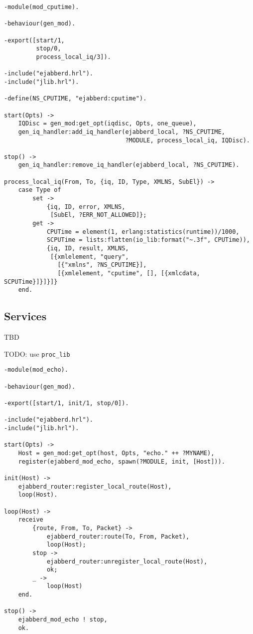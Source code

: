\documentclass[10pt]{article}
\begin{document}
\begin{verbatim}
-module(mod_cputime).

-behaviour(gen_mod).

-export([start/1,
         stop/0,
         process_local_iq/3]).

-include("ejabberd.hrl").
-include("jlib.hrl").

-define(NS_CPUTIME, "ejabberd:cputime").

start(Opts) ->
    IQDisc = gen_mod:get_opt(iqdisc, Opts, one_queue),
    gen_iq_handler:add_iq_handler(ejabberd_local, ?NS_CPUTIME,
                                  ?MODULE, process_local_iq, IQDisc).

stop() ->
    gen_iq_handler:remove_iq_handler(ejabberd_local, ?NS_CPUTIME).

process_local_iq(From, To, {iq, ID, Type, XMLNS, SubEl}) ->
    case Type of
        set ->
            {iq, ID, error, XMLNS,
             [SubEl, ?ERR_NOT_ALLOWED]};
        get ->
            CPUTime = element(1, erlang:statistics(runtime))/1000,
            SCPUTime = lists:flatten(io_lib:format("~.3f", CPUTime)),
            {iq, ID, result, XMLNS,
             [{xmlelement, "query",
               [{"xmlns", ?NS_CPUTIME}],
               [{xmlelement, "cputime", [], [{xmlcdata, SCPUTime}]}]}]}
    end.
\end{verbatim}


\subsection{Services}
\label{sec:services}

TBD


TODO: use \verb|proc_lib|
\begin{verbatim}
-module(mod_echo).

-behaviour(gen_mod).

-export([start/1, init/1, stop/0]).

-include("ejabberd.hrl").
-include("jlib.hrl").

start(Opts) ->
    Host = gen_mod:get_opt(host, Opts, "echo." ++ ?MYNAME),
    register(ejabberd_mod_echo, spawn(?MODULE, init, [Host])).

init(Host) ->
    ejabberd_router:register_local_route(Host),
    loop(Host).

loop(Host) ->
    receive
        {route, From, To, Packet} ->
            ejabberd_router:route(To, From, Packet),
            loop(Host);
        stop ->
            ejabberd_router:unregister_local_route(Host),
            ok;
        _ ->
            loop(Host)
    end.

stop() ->
    ejabberd_mod_echo ! stop,
    ok.
\end{verbatim}
\end{document}

